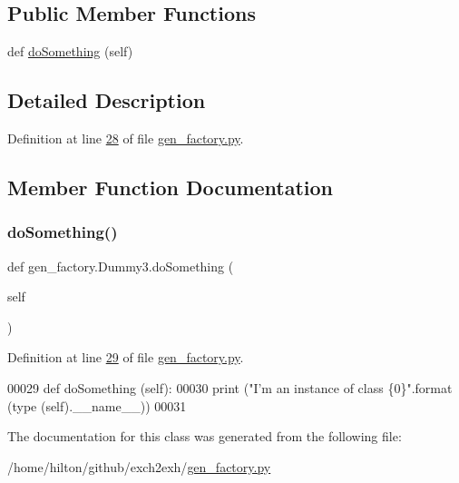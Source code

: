 \subsection*{Public Member Functions}
\begin{DoxyCompactItemize}
\item 
def \hyperlink{classgen__factory_1_1_dummy3_a7cf07349b2202099fb311e45431bfff4}{do\+Something} (self)
\end{DoxyCompactItemize}


\subsection{Detailed Description}


Definition at line \hyperlink{gen__factory_8py_source_l00028}{28} of file \hyperlink{gen__factory_8py_source}{gen\+\_\+factory.\+py}.



\subsection{Member Function Documentation}
\mbox{\label{classgen__factory_1_1_dummy3_a7cf07349b2202099fb311e45431bfff4}} 
\subsubsection{\texorpdfstring{do\+Something()}{doSomething()}}
{\footnotesize\ttfamily def gen\+\_\+factory.\+Dummy3.\+do\+Something (\begin{DoxyParamCaption}\item[{}]{self }\end{DoxyParamCaption})}



Definition at line \hyperlink{gen__factory_8py_source_l00029}{29} of file \hyperlink{gen__factory_8py_source}{gen\+\_\+factory.\+py}.


\begin{DoxyCode}
00029     \textcolor{keyword}{def }doSomething (self):
00030         \textcolor{keywordflow}{print} (\textcolor{stringliteral}{"I'm an instance of class \{0\}"}.format (type (self).\_\_name\_\_))
00031 
\end{DoxyCode}


The documentation for this class was generated from the following file\+:\begin{DoxyCompactItemize}
\item 
/home/hilton/github/exch2exh/\hyperlink{gen__factory_8py}{gen\+\_\+factory.\+py}\end{DoxyCompactItemize}
